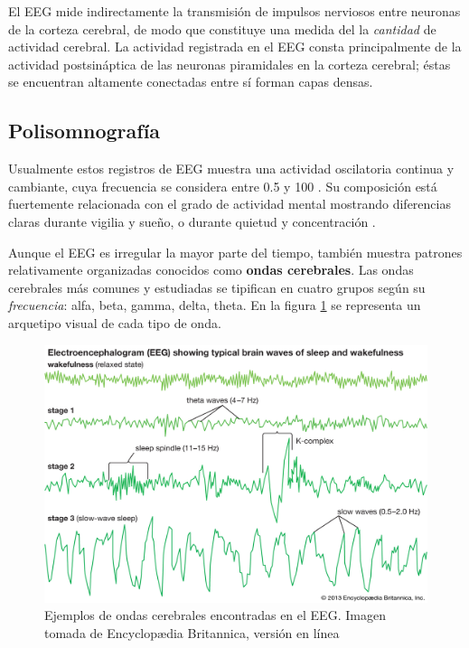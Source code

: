 El EEG mide indirectamente la transmisión de impulsos nerviosos entre neuronas de la corteza 
cerebral, de modo que constituye una medida del la \textit{cantidad} de actividad cerebral. 
%
La actividad registrada en el EEG consta principalmente de la actividad postsináptica de las 
neuronas piramidales en la corteza cerebral; éstas se encuentran altamente conectadas entre sí
forman capas densas.


\subsection{Polisomnografía}

Usualmente estos registros de EEG muestra una actividad oscilatoria continua y cambiante, cuya
frecuencia se considera entre 0.5 y 100 \hz. Su composición está fuertemente relacionada con el 
grado de actividad mental mostrando diferencias claras durante vigilia y sueño, o durante quietud 
y concentración \cite{Clark98_2}.

Aunque el EEG es irregular la mayor parte del tiempo, también muestra patrones relativamente 
organizadas conocidos como \textbf{ondas cerebrales}. 
%
Las ondas cerebrales más comunes y estudiadas se tipifican en cuatro grupos según su 
\textit{frecuencia}: alfa, beta, gamma, delta, theta.
%
En la figura \ref{ritmos} se representa un arquetipo visual de cada tipo de onda.

\begin{figure}
\centering
\includegraphics[width=0.95\linewidth]{./img_diagramas/ondas_britannica.jpg} 
\caption[Ejemplos de ondas cerebrales encontradas en el EEG]
{Ejemplos de ondas cerebrales encontradas en el EEG. Imagen tomada de Encyclop{\ae}dia Britannica, 
versión en línea \cite{Britannica}}
\label{ritmos}
\end{figure}

